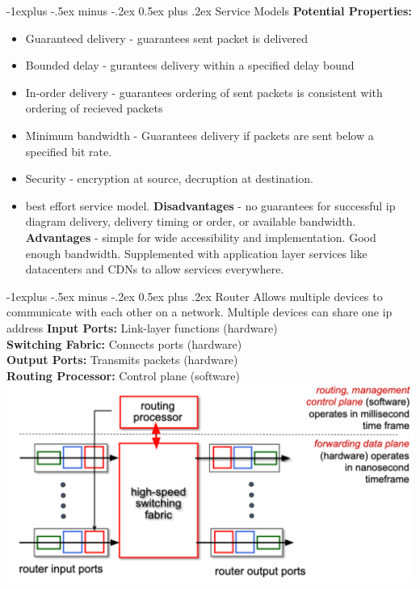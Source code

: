 \documentclass[letterpaper, 8pt]{extarticle}
\makeatletter
\renewcommand{\subsection}{\@startsection{subsection}{2}{0mm}%
                                {-1explus -.5ex minus -.2ex}%
                                {0.5ex plus .2ex}%
                                {\normalfont\small\bfseries}}
\makeatother
\begin{document}
\begin{multicols*}{4}
	\subsection{Service Models}
	\textbf{Potential Properties:}
	\begin{itemize}
		\item Guaranteed delivery - guarantees sent packet is delivered
		\item Bounded delay - gurantees delivery within a specified delay bound
		\item In-order delivery - guarantees ordering of sent packets is consistent with ordering of recieved packets
		\item Minimum bandwidth - Guarantees delivery if packets are sent below a specified bit rate.
		\item Security - encryption at source, decruption at destination.
		\item best effort service model. \textbf{Disadvantages} - no guarantees for successful ip diagram delivery, delivery timing or order, or available bandwidth. \textbf{Advantages} - simple for wide accessibility and implementation. Good enough bandwidth. Supplemented with application layer services like datacenters and CDNs to allow services everywhere.
	\end{itemize}

	\subsection{Router}
	Allows multiple devices to communicate with each other on a network. Multiple devices can share one ip address
	\textbf{Input Ports:} Link-layer functions (hardware) \\
	\textbf{Switching Fabric:} Connects ports (hardware) \\
	\textbf{Output Ports:} Transmits packets (hardware) \\
	\textbf{Routing Processor:} Control plane (software)
	\includegraphics[width=\linewidth]{SCR-20250417-coig.png}


\end{multicols*}
\end{document}
